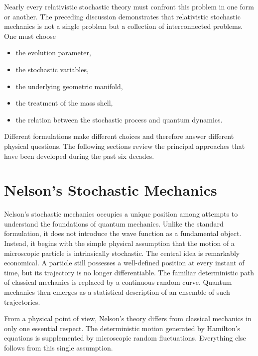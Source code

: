 Nearly every relativistic stochastic theory must confront this problem
in one form or another.
The preceding discussion demonstrates that relativistic stochastic
mechanics is not a single problem but a collection of interconnected
problems.
One must choose
\begin{itemize}
   \item
the evolution parameter,
   \item
the stochastic variables,
   \item
the underlying geometric manifold,
   \item
the treatment of the mass shell,
   \item
the relation between the stochastic process and quantum dynamics.
\end{itemize}
Different formulations make different choices and therefore answer
different physical questions.
The following sections review the principal approaches that have been
developed during the past six decades.%
\section{Nelson's Stochastic Mechanics}
Nelson's stochastic mechanics occupies a unique position among attempts
to understand the foundations of quantum mechanics. Unlike the standard
formulation, it does not introduce the wave function as a fundamental
object. Instead, it begins with the simple physical assumption that the
motion of a microscopic particle is intrinsically stochastic.
The central idea is remarkably economical. A particle still possesses a
well-defined position at every instant of time, but its trajectory is no
longer differentiable. The familiar deterministic path of classical
mechanics is replaced by a continuous random curve.
Quantum mechanics then emerges as a statistical description of an
ensemble of such trajectories.

From a physical point of view, Nelson's theory differs from classical
mechanics in only one essential respect. The deterministic motion
generated by Hamilton's equations is supplemented by microscopic random
fluctuations.
Everything else follows from this single assumption.
